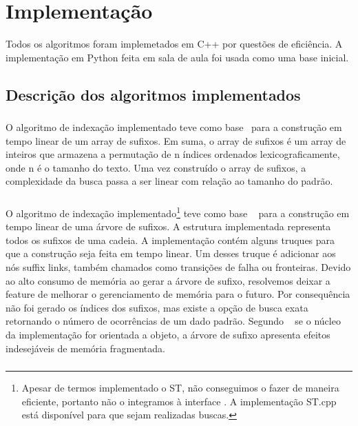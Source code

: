 \section{Implementação}
Todos os algoritmos foram implemetados em C++ por questões de eficiência. A
implementação em Python feita em sala de aula foi usada como uma base inicial.

\subsection{Descrição dos algoritmos implementados}

\subsubsection{\lsa}
O algoritmo de indexação  implementado teve como
base~\cite{KarkkainenS03} para a construção em
tempo linear de um array de sufixos. Em suma, o array de sufixos é um array de
inteiros que armazena a permutação de n índices ordenados lexicograficamente,
onde n é o tamanho do texto. Uma vez construído o array de sufixos, a
complexidade da busca passa a ser linear com relação ao tamanho do padrão.

\subsubsection{\lst}
 
O algoritmo de indexação implementado\footnote{Apesar de termos implementado
o ST, não conseguimos o fazer de maneira eficiente,
portanto não o integramos à interface \ipmt. A implementação ST.cpp
está disponível para que sejam realizadas buscas.}
teve como base ~\cite{UkkonenST} para a construção em tempo linear
de uma árvore de sufixos. A estrutura implementada representa
todos os sufixos de uma cadeia. A implementação contém alguns truques
para que a construção seja feita em tempo linear. Um desses truque é adicionar aos
nós suffix links, também chamados como transições de falha ou fronteiras. Devido 
ao alto consumo de memória ao gerar a árvore de sufixo, resolvemos deixar a feature
de melhorar o gerenciamento de memória para o futuro. Por consequência não foi gerado os índices dos sufixos, mas existe a opção de busca exata retornando o número de ocorrências de um dado padrão. Segundo ~\cite{BogdanCraig} se o núcleo da implementação for orientada a objeto, a árvore de sufixo apresenta efeitos indesejáveis
de memória fragmentada.

\subsubsection{\lz}

